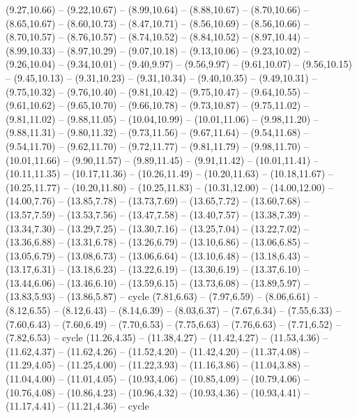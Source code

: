 {(9.27,10.66) -- (9.22,10.67) -- (8.99,10.64) -- (8.88,10.67) -- (8.70,10.66) -- (8.65,10.67) -- (8.60,10.73) -- (8.47,10.71) -- (8.56,10.69) -- (8.56,10.66) -- (8.70,10.57) -- (8.76,10.57) -- (8.74,10.52) -- (8.84,10.52) -- (8.97,10.44) -- (8.99,10.33) -- (8.97,10.29) -- (9.07,10.18) -- (9.13,10.06) -- (9.23,10.02) -- (9.26,10.04) -- (9.34,10.01) -- (9.40,9.97) -- (9.56,9.97) -- (9.61,10.07) -- (9.56,10.15) -- (9.45,10.13) -- (9.31,10.23) -- (9.31,10.34) -- (9.40,10.35) -- (9.49,10.31) -- (9.75,10.32) -- (9.76,10.40) -- (9.81,10.42) -- (9.75,10.47) -- (9.64,10.55) -- (9.61,10.62) -- (9.65,10.70) -- (9.66,10.78) -- (9.73,10.87) -- (9.75,11.02) -- (9.81,11.02) -- (9.88,11.05) -- (10.04,10.99) -- (10.01,11.06) -- (9.98,11.20) -- (9.88,11.31) -- (9.80,11.32) -- (9.73,11.56) -- (9.67,11.64) -- (9.54,11.68) -- (9.54,11.70) -- (9.62,11.70) -- (9.72,11.77) -- (9.81,11.79) -- (9.98,11.70) -- (10.01,11.66) -- (9.90,11.57) -- (9.89,11.45) -- (9.91,11.42) -- (10.01,11.41) -- (10.11,11.35) -- (10.17,11.36) -- (10.26,11.49) -- (10.20,11.63) -- (10.18,11.67) -- (10.25,11.77) -- (10.20,11.80) -- (10.25,11.83) -- (10.31,12.00) -- (14.00,12.00) -- (14.00,7.76) -- (13.85,7.78) -- (13.73,7.69) -- (13.65,7.72) -- (13.60,7.68) -- (13.57,7.59) -- (13.53,7.56) -- (13.47,7.58) -- (13.40,7.57) -- (13.38,7.39) -- (13.34,7.30) -- (13.29,7.25) -- (13.30,7.16) -- (13.25,7.04) -- (13.22,7.02) -- (13.36,6.88) -- (13.31,6.78) -- (13.26,6.79) -- (13.10,6.86) -- (13.06,6.85) -- (13.05,6.79) -- (13.08,6.73) -- (13.06,6.64) -- (13.10,6.48) -- (13.18,6.43) -- (13.17,6.31) -- (13.18,6.23) -- (13.22,6.19) -- (13.30,6.19) -- (13.37,6.10) -- (13.44,6.06) -- (13.46,6.10) -- (13.59,6.15) -- (13.73,6.08) -- (13.89,5.97) -- (13.83,5.93) -- (13.86,5.87) -- cycle
  (7.81,6.63) -- (7.97,6.59) -- (8.06,6.61) -- (8.12,6.55) -- (8.12,6.43) -- (8.14,6.39) -- (8.03,6.37) -- (7.67,6.34) -- (7.55,6.33) -- (7.60,6.43) -- (7.60,6.49) -- (7.70,6.53) -- (7.75,6.63) -- (7.76,6.63) -- (7.71,6.52) -- (7.82,6.53) -- cycle
  (11.26,4.35) -- (11.38,4.27) -- (11.42,4.27) -- (11.53,4.36) -- (11.62,4.37) -- (11.62,4.26) -- (11.52,4.20) -- (11.42,4.20) -- (11.37,4.08) -- (11.29,4.05) -- (11.25,4.00) -- (11.22,3.93) -- (11.16,3.86) -- (11.04,3.88) -- (11.04,4.00) -- (11.01,4.05) -- (10.93,4.06) -- (10.85,4.09) -- (10.79,4.06) -- (10.76,4.08) -- (10.86,4.23) -- (10.96,4.32) -- (10.93,4.36) -- (10.93,4.41) -- (11.17,4.41) -- (11.21,4.36) -- cycle}
